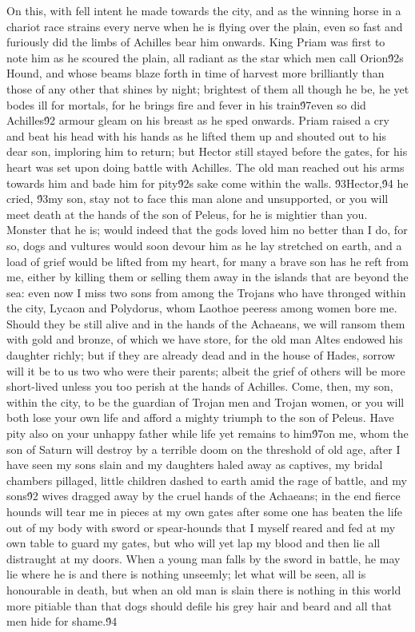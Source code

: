 {On this, with fell intent he made towards the city, and as the winning horse in a chariot race strains every nerve when he is flying over the plain, even so fast and furiously did the limbs of Achilles bear him onwards. King Priam was first to note him as he scoured the plain, all radiant as the star which men call Orion\'92s Hound, and whose beams blaze forth in time of harvest more brilliantly than those of any other that shines by night; brightest of them all though he be, he yet bodes ill for mortals, for he brings fire and fever in his train\'97even so did Achilles\'92 armour gleam on his breast as he sped onwards. Priam raised a cry and beat his head with his hands as he lifted them up and shouted out to his dear son, imploring him to return; but Hector still stayed before the gates, for his heart was set upon doing battle with Achilles. The old man reached out his arms towards him and bade him for pity\'92s sake come within the walls. \'93Hector,\'94 he cried, \'93my son, stay not to face this man alone and unsupported, or you will meet death at the hands of the son of Peleus, for he is mightier than you. Monster that he is; would indeed that the gods loved him no better than I do, for so, dogs and vultures would soon devour him as he lay stretched on earth, and a load of grief would be lifted from my heart, for many a brave son has he reft from me, either by killing them or selling them away in the islands that are beyond the sea: even now I miss two sons from among the Trojans who have thronged within the city, Lycaon and Polydorus, whom Laothoe peeress among women bore me. Should they be still alive and in the hands of the Achaeans, we will ransom them with gold and bronze, of which we have store, for the old man Altes endowed his daughter richly; but if they are already dead and in the house of Hades, sorrow will it be to us two who were their parents; albeit the grief of others will be more short-lived unless you too perish at the hands of Achilles. Come, then, my son, within the city, to be the guardian of Trojan men and Trojan women, or you will both lose your own life and afford a mighty triumph to the son of Peleus. Have pity also on your unhappy father while life yet remains to him\'97on me, whom the son of Saturn will destroy by a terrible doom on the threshold of old age, after I have seen my sons slain and my daughters haled away as captives, my bridal chambers pillaged, little children dashed to earth amid the rage of battle, and my sons\'92 wives dragged away by the cruel hands of the Achaeans; in the end fierce hounds will tear me in pieces at my own gates after some one has beaten the life out of my body with sword or spear-hounds that I myself reared and fed at my own table to guard my gates, but who will yet lap my blood and then lie all distraught at my doors. When a young man falls by the sword in battle, he may lie where he is and there is nothing unseemly; let what will be seen, all is honourable in death, but when an old man is slain there is nothing in this world more pitiable than that dogs should defile his grey hair and beard and all that men hide for shame.\'94\
}
